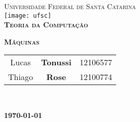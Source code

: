 \begin{titlepage}
\begin{center}

\textsc{\large Universidade Federal de Santa Catarina}\\[1cm]

\texttt{[image: ufsc]}\\[1.5cm]

\textsc{\LARGE \bfseries Teoria da Computação \\ [0.8cm]}

\textsc{\LARGE \bfseries Máquinas \\ [3cm]}

\begin{Large}
\begin{tabular}{|ccc}
Lucas  & \textbf{Tonussi} & \textsc{12106577}\\
Thiago & \textbf{Rose}    & \textsc{12100774}\\
\end{tabular} \\[0.5cm]
\end{Large}

\vfill

\textbf{\today}

\end{center}
\end{titlepage}